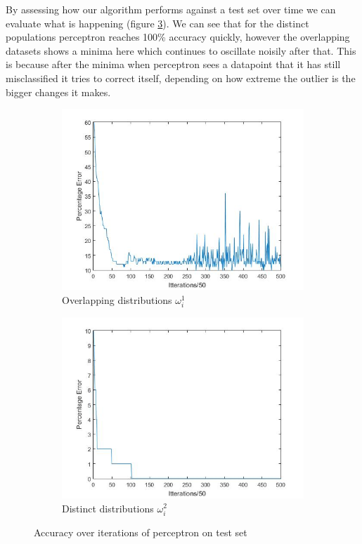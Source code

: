 \documentclass[a4paper,11pt, twocolumn]{article}
\begin{document}
By assessing how our algorithm performs against a test set over time we can evaluate what is happening (figure \ref{fig:fig4}). We can see that for the distinct populations perceptron reaches 100\% accuracy quickly, however the overlapping datasets shows a minima here which continues to oscillate noisily after that. This is because after the minima when perceptron sees a datapoint that it has still misclassified it tries to correct itself, depending on how extreme the outlier is the bigger changes it makes. 
\begin{figure}[ht]
\centering
\begin{subfigure}{.22\textwidth}
	\centering
	\includegraphics[width=\textwidth]{perceptron1.jpg}
	\caption{Overlapping distributions $\omega_i^{1}$}
	\label{fig:fig4a}
\end{subfigure}
\begin{subfigure}{.22\textwidth}
	\centering
	\includegraphics[width=\textwidth]{perceptron2.jpg}
	\caption{Distinct distributions $\omega_i^{2}$}
	\label{fig:fig4b}
\end{subfigure}
\caption{Accuracy over iterations of perceptron on test set}
\label{fig:fig4}
\end{figure}
\end{document}
